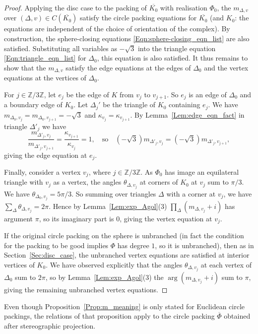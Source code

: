 \documentclass[12pt]{amsart}
\numberwithin{equation}{section}
\theoremstyle{named}
\newcommand{\refsec}[1]{Section~\ref{Sec:#1}}
\newcommand{\refeqn}[1]{\eqref{Eqn:#1}}
\newcommand{\reflem}[1]{Lemma~\ref{Lem:#1}}
\newcommand{\refprop}[1]{Proposition~\ref{Prop:#1}}
\newcommand{\Z}{\mathbb{Z}}
\begin{document}
\begin{proof}
Applying the disc case to the packing of $\overline{K_0}$ with realisation $\Phi_0$, the $m_{\Delta,v}$ over $(\Delta,v) \in C(\overline{K_0})$ satisfy the circle packing equations for $\overline{K_0}$ (and $K_0$: the equations are independent of the choice of orientation of the complex). By construction, the sphere-closing equations \refeqn{sphere-closing_eqn_list} are also satisfied. Substituting all variables as $-\sqrt{3}$ into the triangle equation \refeqn{triangle_eqn_list} for $\Delta_0$, this equation is also satisfied. It thus remains to show that the $m_{\Delta,v}$ satisfy the edge equations at the edges of $\Delta_0$ and the vertex equations at the vertices of $\Delta_0$.

For $j \in \Z/3\Z$, let $e_j$ be the edge of $K$ from $v_j$ to $v_{j+1}$. So $e_j$ is an edge of $\Delta_0$ and a boundary edge of $K_0$. Let $\Delta_j'$ be the triangle of $K_0$ containing $e_j$. We have $m_{\Delta_0,v_j} = m_{\Delta_0,v_{j+1}} = -\sqrt{3}$ and $\kappa_{v_j} = \kappa_{v_{j+1}}$. By \reflem{edge_eqn_fact} in triangle $\Delta'_j$ we have
\[
\frac{m_{\Delta'_j,v_j}}{m_{\Delta'_j,v_{j+1}}}
=\frac{\kappa_{v_{j+1}}}{\kappa_{v_j}} = 1,
\quad \text{so} \quad
(-\sqrt{3})m_{\Delta'_j,v_j} = (-\sqrt{3})m_{\Delta'_j,v_{j+1}},
\]
giving the edge equation at $e_j$.

Finally, consider a vertex $v_j$, where $j \in \Z/3\Z$. As $\Phi_0$ has image an equilateral triangle with $v_j$ as a vertex, the angles $\theta_{\Delta,v_j}$ at corners of $K_0$ at $v_j$ sum to $\pi/3$. We have $\theta_{\Delta_0,v_j} = 5\pi/3$. So summing over triangles $\Delta$ with a corner at $v_j$, we have $\sum_{\Delta} \theta_{\Delta,v_j} = 2\pi$. Hence by \reflem{exp_Agol}(3) $\prod_\Delta (m_{\Delta,v_j} + i)$ has argument $\pi$, so its imaginary part is $0$, giving the vertex equation at $v_j$.

If the original circle packing on the sphere is unbranched (in fact the condition for the packing to be good implies $\Phi$ has degree $1$, so it is unbranched), then as in \refsec{disc_case}, the unbranched vertex equations are satisfied at interior vertices of $K_0$. We have observed explicitly that the angles $\theta_{\Delta,v_j}$ at each vertex of $\Delta_0$ sum to $2\pi$, so by \reflem{exp_Agol}(3) the $\arg(m_{\Delta,v_j}+i)$ sum to $\pi$, giving the remaining unbranched vertex equations. 
\end{proof}

Even though \refprop{m_meaning} is only stated for Euclidean circle packings, the relations of that proposition apply to the circle packing $\overline{\Phi}$ obtained after stereographic projection.
\end{document}
